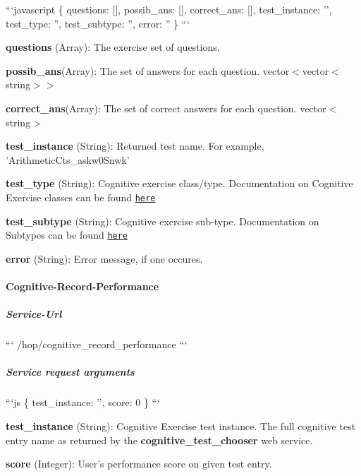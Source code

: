 ```javascript \{ questions\-: \mbox{[}\mbox{]}, possib\-\_\-ans\-: \mbox{[}\mbox{]}, correct\-\_\-ans\-: \mbox{[}\mbox{]}, test\-\_\-instance\-: '', test\-\_\-type\-: '', test\-\_\-subtype\-: '', error\-: '' \} ```


\begin{DoxyItemize}
\item {\bfseries questions} (Array)\-: The exercise set of questions.
\item {\bfseries possib\-\_\-ans}(Array)\-: The set of answers for each question. vector$<$vector$<$string$>$$>$
\item {\bfseries correct\-\_\-ans}(Array)\-: The set of correct answers for each question. vector$<$string$>$
\item {\bfseries test\-\_\-instance} (String)\-: Returned test name. For example, 'Arithmetic\-Cts\-\_\-askw0\-Snwk'
\item {\bfseries test\-\_\-type} (String)\-: Cognitive exercise class/type. Documentation on Cognitive Exercise classes can be found \href{https://github.com/rapp-project/rapp-platform/tree/CognitiveSystem/rapp_cognitive_exercise}{\tt here}
\item {\bfseries test\-\_\-subtype} (String)\-: Cognitive exercise sub-\/type. Documentation on Subtypes can be found \href{https://github.com/rapp-project/rapp-platform/tree/CognitiveSystem/rapp_cognitive_exercise}{\tt here}
\item {\bfseries error} (String)\-: Error message, if one occures.
\end{DoxyItemize}

\paragraph*{Cognitive-\/\-Record-\/\-Performance}

\subparagraph*{Service-\/\-Url}

``` /hop/cognitive\-\_\-record\-\_\-performance ```

\subparagraph*{Service request arguments}

```js \{ test\-\_\-instance\-: '', score\-: 0 \} ```


\begin{DoxyItemize}
\item {\bfseries test\-\_\-instance} (String)\-: Cognitive Exercise test instance. The full cognitive test entry name as returned by the {\bfseries cognitive\-\_\-test\-\_\-chooser} web service.
\item {\bfseries score} (Integer)\-: User's performance score on given test entry.
\end{DoxyItemize}

